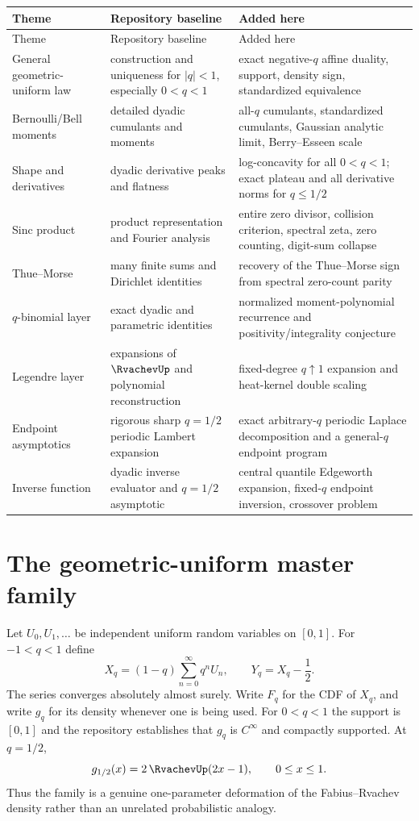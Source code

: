 \documentclass[11pt]{article}
\theoremstyle{definition}
\theoremstyle{remark}
\begin{document}
\begin{longtable}{p{}p{}p{}}
\toprule
Theme & Repository baseline & Added here\\
\midrule
\endfirsthead
\toprule
Theme & Repository baseline & Added here\\
\midrule
\endhead
General geometric-uniform law & construction and uniqueness for $|q|<1$, especially $0<q<1$ & exact negative-$q$ affine duality, support, density sign, standardized equivalence\\
Bernoulli/Bell moments & detailed dyadic cumulants and moments & all-$q$ cumulants, standardized cumulants, Gaussian analytic limit, Berry--Esseen scale\\
Shape and derivatives & dyadic derivative peaks and flatness & log-concavity for all $0<q<1$; exact plateau and all derivative norms for $q\le1/2$\\
Sinc product & product representation and Fourier analysis & entire zero divisor, collision criterion, spectral zeta, zero counting, digit-sum collapse\\
Thue--Morse & many finite sums and Dirichlet identities & recovery of the Thue--Morse sign from spectral zero-count parity\\
$q$-binomial layer & exact dyadic and parametric identities & normalized moment-polynomial recurrence and positivity/integrality conjecture\\
Legendre layer & expansions of $\RvachevUp$ and polynomial reconstruction & fixed-degree $q\uparrow1$ expansion and heat-kernel double scaling\\
Endpoint asymptotics & rigorous sharp $q=1/2$ periodic Lambert expansion & exact arbitrary-$q$ periodic Laplace decomposition and a general-$q$ endpoint program\\
Inverse function & dyadic inverse evaluator and $q=1/2$ asymptotic & central quantile Edgeworth expansion, fixed-$q$ endpoint inversion, crossover problem\\
\bottomrule
\end{longtable}

\section{The geometric-uniform master family}

Let $U_0,U_1,\ldots$ be independent uniform random variables on $[0,1]$.  For $-1<q<1$ define
\begin{equation}\label{eq:Xq-def}
 X_q=(1-q)\sum_{n=0}^{\infty}q^nU_n,
 \qquad
 Y_q=X_q-\frac12.
\end{equation}
The series converges absolutely almost surely.  Write $F_q$ for the CDF of $X_q$, and write $g_q$ for its density whenever one is being used.  For $0<q<1$ the support is $[0,1]$ and the repository establishes that $g_q$ is $C^\infty$ and compactly supported.  At $q=1/2$,
\begin{equation}\label{eq:fabius-up-bridge}
 g_{1/2}(x)=2\,\RvachevUp(2x-1),\qquad 0\le x\le1.
\end{equation}
Thus the family is a genuine one-parameter deformation of the Fabius--Rvachev density rather than an unrelated probabilistic analogy.
\end{document}
